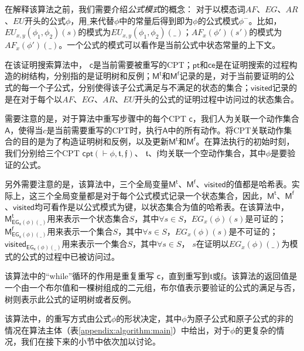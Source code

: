 在解释该算法之前，我们需要介绍\textit{公式模式}的概念：
对于以模态词$AF$、$EG$、$AR$、$EU$开头的公式$\phi$，用$\_$来代替$\phi$中的常量后得到即为$\phi$的公式模式$\phi^-$。比如，$EU_{x,y}(\phi_1,\phi_2)(s)$的模式为$EU_{x,y}(\phi_1,\phi_2)(\_)$；$AF_x(\phi')(s')$的模式为$AF_x(\phi')(\_)$。一个公式的模式可以看作是当前公式中状态常量的上下文。


在该证明搜索算法中，
$\mathsf{c}$是当前需要被重写的\textsf{CPT}；$\mathsf{pt}$和$\mathsf{ce}$是在证明搜索的过程构造的树结构，分别指的是证明树和反例；$\mathsf{M^t}$和$\mathsf{M^f}$记录的是，对于当前要证明的公式的每一个子公式，分别使得该子公式满足与不满足的状态的集合；$\mathsf{visited}$记录的是在对于每个以$AF$、$EG$、$AR$、$EU$开头的公式的证明过程中访问过的状态集合。

需要注意的是，对于算法中重写步骤中的每个\textsf{CPT} $\mathsf{c}$，我们人为关联一个动作集合$\mathsf{A}$，使得当$c$是当前需要重写的\textsf{CPT}时，执行$\mathsf{A}$中的所有动作。将\textsf{CPT}关联动作集合的目的是为了构造证明树和反例，以及更新$\mathsf{M^t}$和$\mathsf{M^f}$。在算法执行的初始时刻，我们分别给三个\textsf{CPT} $\textsf{cpt}(\vdash\phi,\mathfrak{t},\mathfrak{f})$、 $\mathfrak{t}$、$\mathfrak{f}$均关联一个空动作集合，其中$\phi$是要验证的公式。


另外需要注意的是，该算法中，三个全局变量$\mathsf{M^t}$、$\mathsf{M^f}$、$\mathsf{visited}$的值都是哈希表。实际上，这三个全局变量都是对于每个公式模式记录一个状态集合，因此，$\mathsf{M^t}$、$\mathsf{M^f}$、$\mathsf{visited}$均可看作是以公式模式为键，以状态集合为值的哈希表。在该算法中，$\mathsf{M^t_{EG_{x}(\phi)(\_)}}$用来表示一个状态集合$S$，其中$\forall s\in S$，$EG_{x}(\phi)(s)$是可证的；$\mathsf{M^f_{EG_{x}(\phi)(\_)}}$用来表示一个集合$S$，其中$\forall s\in S$，$EG_{x}(\phi)(s)$是不可证的；$\mathsf{visited_{EG_x(\phi)(\_)}}$用来表示一个集合$S$，其中$\forall s\in S$， $s$在证明以$EG_x(\phi)(\_)$为模式的公式的过程中已被访问过。


该算法中的“while”循环的作用是重复重写\CPT{} $\mathsf{c}$，直到重写到$\mathfrak{t}$或$\mathfrak{f}$。该算法的返回值是一个由一个布尔值和一棵树组成的二元组，布尔值表示要验证的公式的满足与否，树则表示此公式的证明树或者反例。


该算法中，\CPT{}的重写方式由公式$\phi$的形状决定，其中$\phi$为原子公式和原子公式的非的情况在算法主体（表\ref{appendix:algorithm:main}）中给出，对于$\phi$的更复杂的情况，我们在接下来的小节中依次加以讨论。


